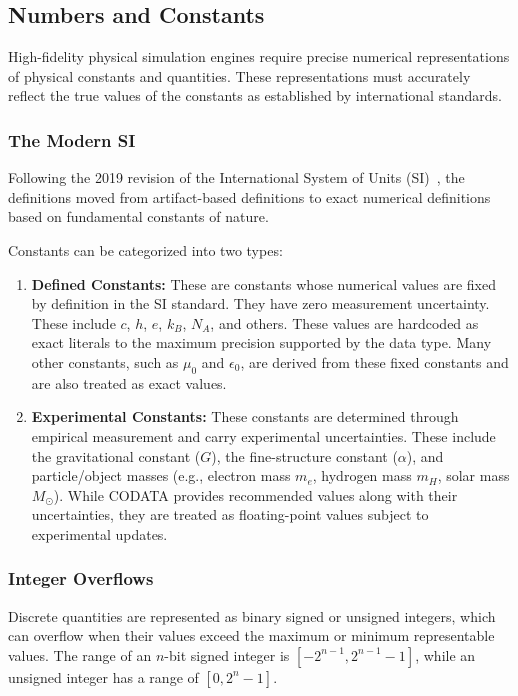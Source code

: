 \subsection{Numbers and Constants}\label{subsec:physics-numbers-constants}

High-fidelity physical simulation engines require precise numerical representations of physical constants and quantities. 
These representations must accurately reflect the true values of the constants as established by international standards.

\subsubsection{The Modern SI}
Following the 2019 revision of the International System of Units (SI)~\cite{BIPM2019SIBrochure,Newell2019NIST330}, 
the definitions moved from artifact-based definitions to exact numerical definitions based on fundamental constants of nature.

Constants can be categorized into two types: 
\begin{enumerate}
\item \textbf{Defined Constants:} These are constants whose numerical values are fixed by definition in the SI standard. 
    They have zero measurement uncertainty. 
    These include $c$, $h$, $e$, $k_B$, $N_A$, and others.
    These values are hardcoded as exact literals to the maximum precision supported by the data type.
    Many other constants, such as $\mu_0$ and $\epsilon_0$, are derived from these fixed constants 
    and are also treated as exact values.
\item \textbf{Experimental Constants:} These constants are determined through empirical measurement 
    and carry experimental uncertainties\cite{Mohr2016CODATA}. 
    These include the gravitational constant ($G$), the fine-structure constant ($\alpha$), 
    and particle/object masses (e.g., electron mass $m_e$, hydrogen mass $m_H$, solar mass $M_\odot$). 
    While CODATA provides recommended values along with their uncertainties, 
    they are treated as floating-point values subject to experimental updates.
\end{enumerate}

\subsubsection{Integer Overflows}

Discrete quantities are represented as binary signed or unsigned integers,
which can overflow when their values exceed the maximum or minimum representable values.
The range of an $n$-bit signed integer is $[-2^{n-1}, 2^{n-1}-1]$,
while an unsigned integer has a range of $[0, 2^n-1]$.

